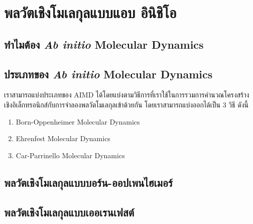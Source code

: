 

\chapter{พลวัตเชิงโมเลกุลแบบแอบ อินิชิโอ}
\label{ch:aimd}

\section{ทำไมต้อง \textit{Ab initio} Molecular Dynamics}


\section{ประเภทของ \textit{Ab initio} Molecular Dynamics}

เราสามารถแบ่งประเภทของ AIMD ได้โดยแบ่งตามวิธีการที่เราใช้ในการรวมการคำนวณโครงสร้างเชิงอิเล็กทรอนิกส์กับการจำลองพลวัตโมเลกุลเข้าด้วยกัน 
โดยเราสามารถแบ่งออกได้เป็น 3 วิธี ดังนี้ 

\begin{enumerate}
    \item Born-Oppenheimer Molecular Dynamics
    \item Ehrenfest Molecular Dynamics
    \item Car-Parrinello Molecular Dynamics
\end{enumerate}

\section{พลวัตเชิงโมเลกุลแบบบอร์น-ออปเพนไฮเมอร์}

\section{พลวัตเชิงโมเลกุลแบบเออเรนเฟสต์}

